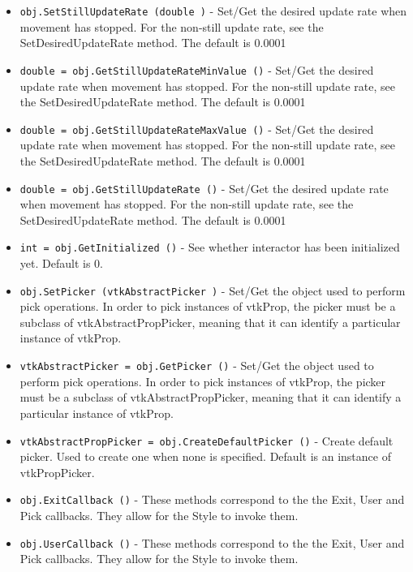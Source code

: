 \begin{itemize}
\item  \verb|obj.SetStillUpdateRate (double )| -  Set/Get the desired update rate when movement has stopped.
 For the non-still update rate, see the SetDesiredUpdateRate method.
 The default is 0.0001

\item  \verb|double = obj.GetStillUpdateRateMinValue ()| -  Set/Get the desired update rate when movement has stopped.
 For the non-still update rate, see the SetDesiredUpdateRate method.
 The default is 0.0001

\item  \verb|double = obj.GetStillUpdateRateMaxValue ()| -  Set/Get the desired update rate when movement has stopped.
 For the non-still update rate, see the SetDesiredUpdateRate method.
 The default is 0.0001

\item  \verb|double = obj.GetStillUpdateRate ()| -  Set/Get the desired update rate when movement has stopped.
 For the non-still update rate, see the SetDesiredUpdateRate method.
 The default is 0.0001

\item  \verb|int = obj.GetInitialized ()| -  See whether interactor has been initialized yet.
 Default is 0.

\item  \verb|obj.SetPicker (vtkAbstractPicker )| -  Set/Get the object used to perform pick operations. In order to
 pick instances of vtkProp, the picker must be a subclass of 
 vtkAbstractPropPicker, meaning that it can identify a particular 
 instance of vtkProp.

\item  \verb|vtkAbstractPicker = obj.GetPicker ()| -  Set/Get the object used to perform pick operations. In order to
 pick instances of vtkProp, the picker must be a subclass of 
 vtkAbstractPropPicker, meaning that it can identify a particular 
 instance of vtkProp.

\item  \verb|vtkAbstractPropPicker = obj.CreateDefaultPicker ()| -  Create default picker. Used to create one when none is specified.
 Default is an instance of vtkPropPicker.

\item  \verb|obj.ExitCallback ()| -  These methods correspond to the the Exit, User and Pick
 callbacks. They allow for the Style to invoke them.

\item  \verb|obj.UserCallback ()| -  These methods correspond to the the Exit, User and Pick
 callbacks. They allow for the Style to invoke them.


\end{itemize}
